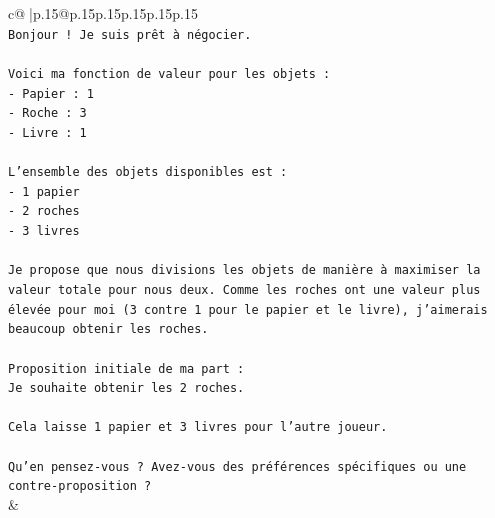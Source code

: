 \documentclass{article}
\begin{document}
{\begin{supertabular}{c@{$\;$}|p{.15\linewidth}@{}p{.15\linewidth}p{.15\linewidth}p{.15\linewidth}p{.15\linewidth}p{.15\linewidth}}
{{{\\ 
\texttt{Bonjour ! Je suis prêt à négocier.} \\
\\ 
\texttt{Voici ma fonction de valeur pour les objets :} \\
\texttt{{-} Papier : 1} \\
\texttt{{-} Roche : 3} \\
\texttt{{-} Livre : 1} \\
\\ 
\texttt{L'ensemble des objets disponibles est :} \\
\texttt{{-} 1 papier} \\
\texttt{{-} 2 roches} \\
\texttt{{-} 3 livres} \\
\\ 
\texttt{Je propose que nous divisions les objets de manière à maximiser la valeur totale pour nous deux. Comme les roches ont une valeur plus élevée pour moi (3 contre 1 pour le papier et le livre), j'aimerais beaucoup obtenir les roches.} \\
\\ 
\texttt{Proposition initiale de ma part :} \\
\texttt{Je souhaite obtenir les 2 roches.} \\
\\ 
\texttt{Cela laisse 1 papier et 3 livres pour l'autre joueur.} \\
\\ 
\texttt{Qu'en pensez{-}vous ? Avez{-}vous des préférences spécifiques ou une contre{-}proposition ?} \\
            }
        }
    }
    & \\ \\


\end{supertabular}}
\end{document}
